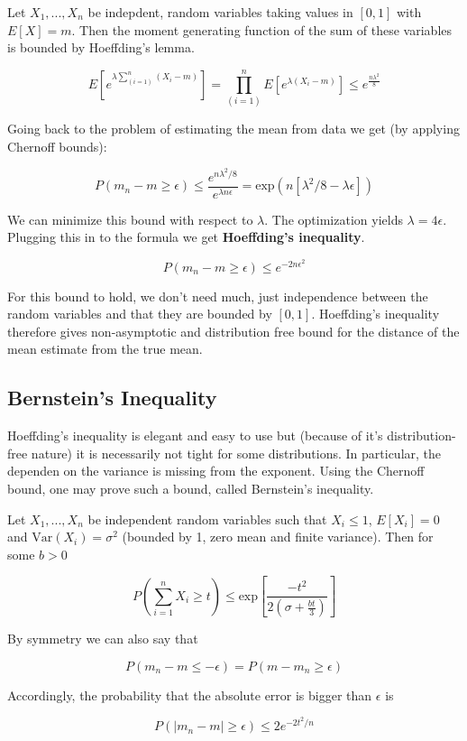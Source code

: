\documentclass[12pt, authoryear]{elsarticle}
\begin{document}
Let $X_1, ... , X_n$ be indepdent, random variables taking values in $[0,1]$ with $E[X] = m$. Then the moment generating function of the sum of these variables is bounded by Hoeffding's lemma. 

$$E[e^{\lambda \sum_{(i=1)}^n (X_i - m)}] = \prod_{(i=1)}^n E[e^{\lambda (X_i -m) } ] \leq e^{\frac{n \lambda^2}{8}}$$

Going back to the problem of estimating the mean from data we get (by applying Chernoff bounds):

$$P(m_n - m \geq \epsilon ) \leq \frac{e^{n \lambda^2 / 8}}{e^{\lambda n \epsilon}} = \text{exp} (n[\lambda^2/8 - \lambda \epsilon]) $$

We can minimize this bound with respect to $\lambda$. The optimization yields $\lambda = 4 \epsilon$. Plugging this in to the formula we get \textbf{Hoeffding's inequality}. 

$$ P (m_n - m \geq \epsilon) \leq e^{-2n \epsilon^2}$$ 

For this bound to hold, we don't need much, just independence between the random variables and that they are bounded by $[0,1]$. Hoeffding's inequality therefore gives non-asymptotic and distribution free bound for the distance of the mean estimate from the true mean. 

\subsection{Bernstein's Inequality}

Hoeffding's inequality is elegant and easy to use but (because of it's distribution-free nature) it is necessarily not tight for some distributions. In particular, the dependen on the variance is missing from the exponent. Using the Chernoff bound, one may prove such a bound, called Bernstein's inequality. 

Let $X_1, ..., X_n$ be independent random variables such that $X_i \leq 1$, $E[X_i] = 0$ and $\text{Var}(X_i) = \sigma ^2$ (bounded by 1, zero mean and finite variance). Then for some $b > 0 $

$$P ( \sum_{i = 1}^n X_i \geq t) \leq \text{exp}[\frac{-t^2}{2( \sigma + \frac{bt}{3})}]$$ 

By symmetry we can also say that

$$P(m_n - m \leq -\epsilon) = P(m - m_n \geq \epsilon)$$ 

Accordingly, the probability that the absolute error is bigger than $\epsilon$ is 

$$P( | m_n - m | \geq \epsilon) \leq 2 e^{-2t^2 / n}$$
\end{document}
